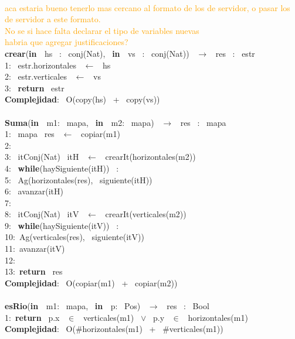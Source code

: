 \begin{Algoritmos}
    \\
    \textcolor{orange}{
        aca estaria bueno tenerlo mas cercano al formato de los de servidor, o pasar los de servidor a este formato. \\
        No se si hace falta declarar el tipo de variables nuevas \\
        habria que agregar justificaciones?
    }
    \\
    \noindent \noindent\makebox[\linewidth]{\rule{\textwidth}{0.4pt}}
    \textbf{crear}(\textbf{in \ }hs \ : \ conj(Nat), \ \textbf{in \ }vs \ : \ conj(Nat)) \ $\longrightarrow$ \ res \ : \ estr\\
    1: \ \indent estr.horizontales \ $\leftarrow$ \ hs\\
    2: \ \indent estr.verticales \ $\leftarrow$ \ vs \ \\
    3: \ \indent \textbf{return} \ estr\\
    \textbf{Complejidad}: \ O(copy(hs) \ + \ copy(vs))\\
    \noindent\makebox[\linewidth]{\rule{\textwidth}{0.4pt}}
    \\
    \noindent\makebox[\linewidth]{\rule{\textwidth}{0.4pt}}
    \textbf{Suma}(\textbf{in \ }m1: \ mapa, \ \textbf{in \ }m2: \ mapa) \ $\longrightarrow$ \ res \ : \ mapa\\
    1: \ \indent mapa \ res \ $\leftarrow$ \ copiar(m1)\\
    2: \ \\
    3: \ \indent itConj(Nat) \ itH \ $\leftarrow$ \ crearIt(horizontales(m2))\\
    4: \ \indent \textbf{while}(haySiguiente(itH)) \ :\\
    5: \ \indent \indent Ag(horizontales(res), \ siguiente(itH))\\
    6: \ \indent \indent avanzar(itH)\\
    7: \ \\
    8: \ \indent itConj(Nat) \ itV \ $\leftarrow$ \ crearIt(verticales(m2))\\
    9: \ \indent \textbf{while}(haySiguiente(itV)) \ :\\
    10:\ \indent \indent Ag(verticales(res), \ siguiente(itV))\\
    11:\ \indent \indent avanzar(itV)\\
    12:\ \\
    13:\ \indent \textbf{return} \ res\\
    \textbf{Complejidad}: \ O(copiar(m1) \ + \ copiar(m2))\\
    \noindent\makebox[\linewidth]{\rule{\textwidth}{0.4pt}}
    \\
    \noindent\makebox[\linewidth]{\rule{\textwidth}{0.4pt}}
    \textbf{esRio}(\textbf{in \ }m1: \ mapa, \ \textbf{in \ }p: \ Pos) \ $\longrightarrow$ \ res \ : \ Bool\\
    1:\ \indent \textbf{return} \ p.x \ $\in$ \ verticales(m1) \ $\vee$ \ p.y \ $\in$ \ horizontales(m1)\\
    \textbf{Complejidad}: \ O($ \# $horizontales(m1) \ + \ $ \# $verticales(m1))\\
    \noindent\makebox[\linewidth]{\rule{\textwidth}{0.4pt}}    
\end{Algoritmos}
